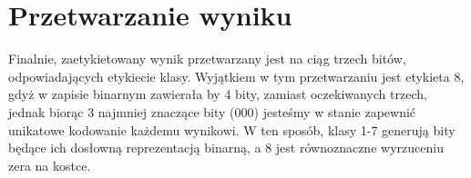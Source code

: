 \section{Przetwarzanie wyniku}

Finalnie, zaetykietowany wynik przetwarzany jest na ciąg trzech bitów, odpowiadających etykiecie klasy.
Wyjątkiem w tym przetwarzaniu jest etykieta 8, gdyż w zapisie binarnym zawierała by 4 bity,
zamiast oczekiwanych trzech, jednak biorąc 3 najmniej znaczące bity (000)
jesteśmy w stanie zapewnić unikatowe kodowanie każdemu wynikowi.
W ten sposób, klasy 1-7 generują bity będące ich dosłowną reprezentacją binarną,
a 8 jest równoznaczne wyrzuceniu zera na kostce.





